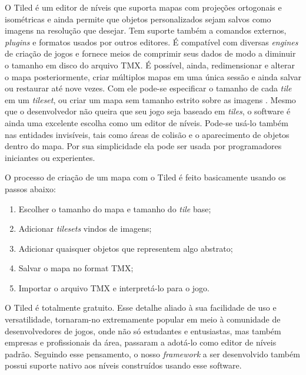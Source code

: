 %
\par
O Tiled é um editor de níveis que suporta mapas com projeções ortogonais e isométricas e ainda permite que 
objetos personalizados sejam salvos como imagens na resolução que desejar. Tem suporte também a comandos externos, 
\textit{plugins} e formatos usados por outros editores. É compatível 
com diversas \textit{engines} de criação de jogos e fornece meios de comprimir seus dados de modo a diminuir o tamanho em disco do arquivo TMX.
É possível, ainda, redimensionar e alterar o mapa posteriormente, criar múltiplos mapas em uma única sessão e ainda salvar ou 
restaurar até nove vezes. Com ele pode-se especificar o tamanho de cada \textit{tile} em um \textit{tileset}, ou criar um mapa sem tamanho estrito 
sobre as imagens \cite{TiledTutorial}.
Mesmo que o desenvolvedor não queira que seu jogo seja baseado em \textit{tiles}, o software é ainda uma excelente escolha como um editor 
de níveis. Pode-se usá-lo também nas entidades invisíveis, tais como áreas de colisão e o aparecimento de objetos dentro do 
mapa. Por sua simplicidade ela pode ser usada por programadores iniciantes ou experientes.
\par 
O processo de criação de um mapa com o Tiled é feito basicamente usando os passos abaixo:
%
\begin{enumerate}
 \item Escolher o tamanho do mapa e tamanho do \textit{tile} base;
 \item Adicionar \textit{tilesets} vindos de imagens;
 \item Adicionar quaisquer objetos que representem algo abstrato;
 \item Salvar o mapa no format TMX;
 \item Importar o arquivo TMX e interpretá-lo para o jogo.
\end{enumerate}
O Tiled é totalmente gratuito. Esse detalhe aliado à sua facilidade de uso e versatilidade, tornaram-no extremamente popular em meio
à comunidade de desenvolvedores de jogos, onde não só estudantes e entusiastas, mas também empresas e profissionais da área, passaram a adotá-lo 
como editor de níveis padrão. Seguindo esse pensamento, o nosso \textit{framework} a ser desenvolvido também possui suporte nativo
aos níveis construídos usando esse software.
%
%
%

%
%


